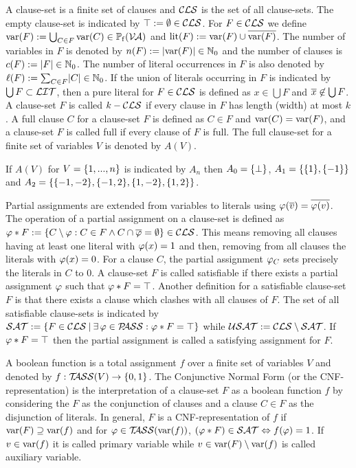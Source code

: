 \documentclass[]{book}
\begin{document}
A clause-set is a finite set of clauses and $\mathcal{CLS}$ is the set of all clause-sets. The empty clause-set is indicated by $\top := \emptyset \in \mathcal{CLS}$. For $F \in \mathcal{CLS}$ we define $\operatorname{var}(F) := \bigcup_{C \in F} \operatorname{var}(C) \in \operatorname{\mathbb{P}_f}(\mathcal{V\hspace{-0.1em}A})$ and $\operatorname{lit}(F) := \operatorname{var}(F) \cup \overline{\operatorname{var}(F)}$. The number of variables in $F$ is denoted by $n(F) := \lvert \operatorname{var}(F) \rvert \in \mathbb{N}_0$ and the number of clauses is $c(F) := \lvert F \rvert \in \mathbb{N}_0$. The number of literal occurrences in $F$ is also denoted by $\ell(F) := \sum_{C \in F} \lvert C \rvert \in \mathbb{N}_0$. If the union of literals occurring in $F$ is indicated by $\bigcup F \subset \mathcal{LIT}$, then a pure literal for $F \in \mathcal{CLS}$ is defined as $x \in \bigcup F$ and $\overline{x} \not \in \bigcup F$. A clause-set $F$ is called $k-\mathcal{CLS}$ if every clause in $F$ has length (width) at most $k$. A full clause $C$  for a clause-set $F$ is defined as $C \in F$ and $\operatorname{var}(C) = \operatorname{var}(F)$, and a clause-set $F$ is called full if every clause of $F$ is full. The full clause-set for a finite set of variables $V$ is denoted by $A(V)$. 

\begin{examp}\label{exp:An}
  If $A(V)$ for $V=\{ 1,..., n \}$ is indicated by $A_n$ then $A_0 = \{ \bot \}$, $A_1 = \{ \{ 1 \},\{ -1 \} \}$ and $A_2 = \{ \{ -1,-2 \},\{ -1,2 \},\{ 1,-2 \},\{ 1,2 \} \}$.
\end{examp}

Partial assignments are extended from variables to literals using $\varphi(\overline{v})=\overline{\varphi(v)}$. The operation of a partial assignment on a clause-set is defined as $\varphi * F := \{ C \setminus \varphi : C \in F \wedge C \cap \overline{\varphi} = \emptyset \} \in \mathcal{CLS}$. This means removing all clauses having at least one literal with $\varphi (x)=1$ and then, removing from all clauses the literals with $\varphi (x)=0$. For a clause $C$, the partial assignment $\varphi_C$ sets precisely the literals in $C$ to 0. A clause-set $F$ is called satisfiable if there exists a partial assignment $\varphi$ such that $\varphi * F = \top$. Another definition for a satisfiable clause-set $F$ is that there exists a clause which clashes with all clauses of $F$. The set of all satisfiable clause-sets is indicated by $\mathcal{SAT} := \{ F \in \mathcal{CLS} {\:|\:} \exists\, \varphi \in \mathcal{P\hspace{-0.32em}ASS} : \varphi * F = \top \}$ while $\mathcal{USAT} := \mathcal{CLS} \setminus \mathcal{SAT}$. If $\varphi * F = \top$ then the partial assignment is called a satisfying assignment for $F$.

A boolean function is a total assignment $f$ over a finite set of variables $V$ and denoted by $f:  \mathcal{T\hspace{-0.35em}ASS}(V) \rightarrow \{ 0,1 \}$. The Conjunctive Normal Form (or the CNF-representation) is the interpretation of a clause-set $F$ as a boolean function $f$ by considering the $F$ as the conjunction of clauses and a clause $C \in F$ as the disjunction of literals. In general, $F$ is a CNF-representation of $f$ if $\operatorname{var}(F) \supseteq \operatorname{var}(f)$ and for $\varphi \in \mathcal{T\hspace{-0.35em}ASS}(\operatorname{var}(f))$, $(\varphi * F) \in \mathcal{SAT} \Leftrightarrow f(\varphi) = 1$. If $v \in \operatorname{var}(f)$ it is called primary variable while $v \in \operatorname{var}(F) \setminus \operatorname{var}(f)$ is called auxiliary variable.
\end{document}
